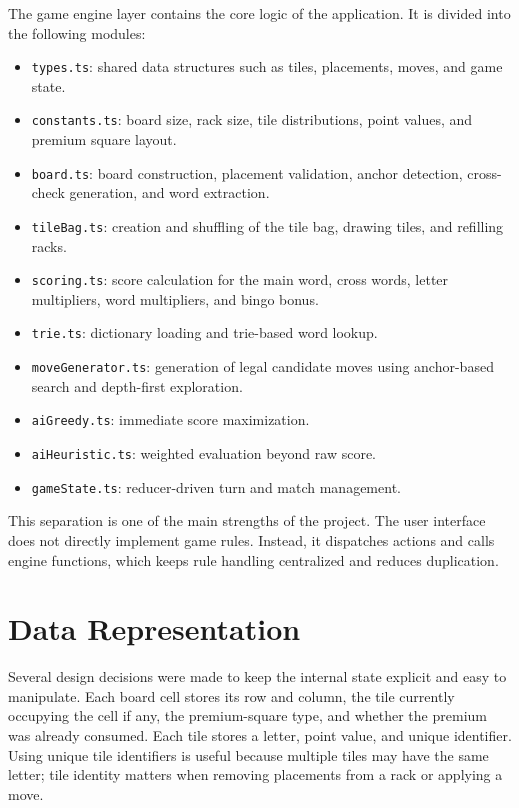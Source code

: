 \documentclass[conference]{IEEEtran}
\begin{document}
The game engine layer contains the core logic of the application. It is divided into the following modules:
\begin{itemize}
\item \texttt{types.ts}: shared data structures such as tiles, placements, moves, and game state.
\item \texttt{constants.ts}: board size, rack size, tile distributions, point values, and premium square layout.
\item \texttt{board.ts}: board construction, placement validation, anchor detection, cross-check generation, and word extraction.
\item \texttt{tileBag.ts}: creation and shuffling of the tile bag, drawing tiles, and refilling racks.
\item \texttt{scoring.ts}: score calculation for the main word, cross words, letter multipliers, word multipliers, and bingo bonus.
\item \texttt{trie.ts}: dictionary loading and trie-based word lookup.
\item \texttt{moveGenerator.ts}: generation of legal candidate moves using anchor-based search and depth-first exploration.
\item \texttt{aiGreedy.ts}: immediate score maximization.
\item \texttt{aiHeuristic.ts}: weighted evaluation beyond raw score.
\item \texttt{gameState.ts}: reducer-driven turn and match management.
\end{itemize}

This separation is one of the main strengths of the project. The user interface does not directly implement game rules. Instead, it dispatches actions and calls engine functions, which keeps rule handling centralized and reduces duplication.

\section{Data Representation}
Several design decisions were made to keep the internal state explicit and easy to manipulate. Each board cell stores its row and column, the tile currently occupying the cell if any, the premium-square type, and whether the premium was already consumed. Each tile stores a letter, point value, and unique identifier. Using unique tile identifiers is useful because multiple tiles may have the same letter; tile identity matters when removing placements from a rack or applying a move.
\end{document}
